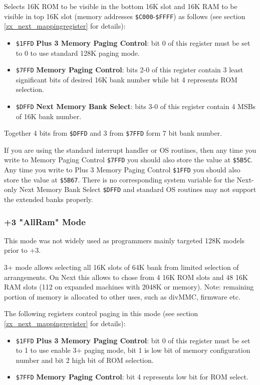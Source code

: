 \documentclass[oneside,a4paper]{book}
\begin{document}
Selects 16K ROM to be visible in the bottom 16K slot and 16K RAM to be visible in top 16K slot (memory addresses {\tt \$C000}-{\tt \$FFFF}) as follows (see section \ref{zx_next_mappingregister} for details):

\begin{itemize}
	\item {\tt \$1FFD} \textbf{Plus 3 Memory Paging Control}: bit 0 of this register must be set to 0 to use standard 128K paging mode.
	
	\item {\tt \$7FFD} \textbf{Memory Paging Control}: bits 2-0 of this register contain 3 least significant bits of desired 16K bank number while bit 4 represents ROM selection.
	
	\item {\tt \$DFFD} \textbf{Next Memory Bank Select}: bits 3-0 of this register contain 4 MSBs of 16K bank number.
\end{itemize}

Together 4 bits from {\tt \$DFFD} and 3 from {\tt \$7FFD} form 7 bit bank number.

If you are using the standard interrupt handler or OS routines, then any time you write to Memory Paging Control {\tt \$7FFD} you should also store the value at {\tt \$5B5C}. Any time you write to Plus 3 Memory Paging Control {\tt \$1FFD} you should also store the value at {\tt \$5B67}. There is no corresponding system variable for the Next-only Next Memory Bank Select {\tt \$DFFD} and standard OS routines may not support the extended banks properly.


\subsubsection{+3 "AllRam" Mode}

This mode was not widely used as programmers mainly targeted 128K models prior to +3.

3+ mode allows selecting all 16K slots of 64K bank from limited selection of arrangements. On Next this allows to chose from 4 16K ROM slots and 48 16K RAM slots (112 on expanded machines with 2048K or memory). Note: remaining portion of memory is allocated to other uses, such as divMMC, firmware etc.

The following registers control paging in this mode (see section \ref{zx_next_mappingregister} for details):

\begin{itemize}
	\item {\tt \$1FFD} \textbf{Plus 3 Memory Paging Control}: bit 0 of this register must be set to 1 to use enable 3+ paging mode, bit 1 is low bit of memory configuration number and bit 2 high bit of ROM selection.
	
	\item {\tt \$7FFD} \textbf{Memory Paging Control}: bit 4 represents low bit for ROM select.
\end{itemize}
\end{document}
